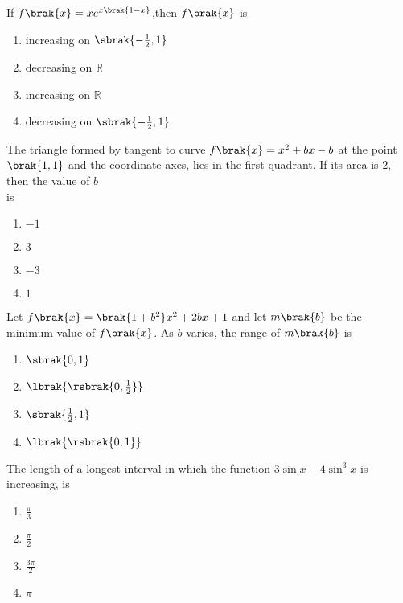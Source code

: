 \item If $f\brak{x}=xe^{x\brak{1-x}}$,then $f\brak{x}$ is 
\hfill {}
\begin{multicols}{2}
\begin{enumerate}
    \item increasing on $\sbrak{-\frac{1}{2},1}$
    \item decreasing on $\mathbb{R}$
    \item increasing on $\mathbb{R}$
    \item decreasing on $\sbrak{-\frac{1}{2},1}$
\end{enumerate}
\end{multicols}

\item The triangle formed by tangent to curve $f\brak{x}=x^2+bx-b$ at the point $\brak{1,1}$ and the coordinate axes, lies in the first quadrant. If its area is $2$, then the value of $b$ \\is 
\hfill {}
\begin{multicols}{2}
\begin{enumerate}
    \item$-1$
    \item$3$
    \item$-3$
    \item$1$
\end{enumerate}
\end{multicols}
\item Let $f\brak{x}=\brak{1+b^2}x^2+2bx+1$ and let $m\brak{b}$ be the minimum value of $f\brak{x}$. As $b$ varies, the range of $m\brak{b}$ is 
\hfill {}
\begin{multicols}{2}
\begin{enumerate}
    \item $\sbrak{0,1}$
    \item $\lbrak{\rsbrak{0,\frac{1}{2}}}$
    \item $\sbrak{\frac{1}{2},1}$
    \item $\lbrak{\rsbrak{0,1}}$
\end{enumerate}
\end{multicols}
\item The length of a longest interval in which the function $3 \sin x-4\sin^3x$ is increasing, is \hfill {}
\begin{multicols}{2}
\begin{enumerate}
    \item $\frac{\pi}{3}$
    \item $\frac{\pi}{2}$
    \item $\frac{3\pi}{2}$
    \item $\pi$
\end{enumerate}
\end{multicols}
